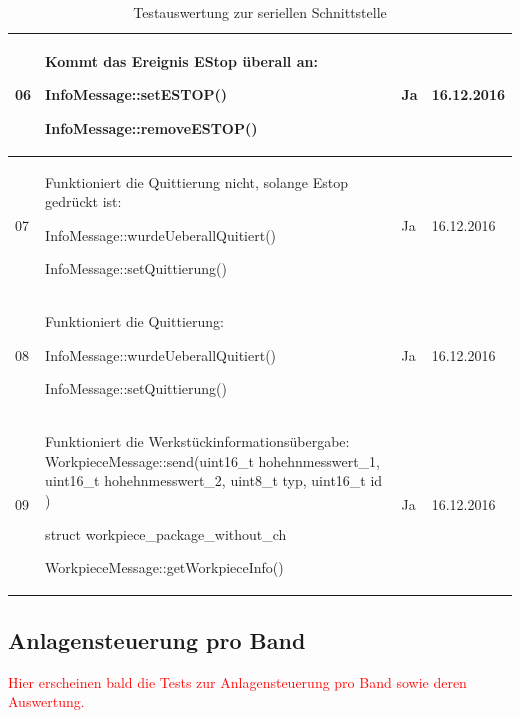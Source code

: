 \documentclass[a4paper, 11pt]{article}
\begin{document}
\begin{table}[H]
\begin{tabularx}{\textwidth}{|l|X|l|l|}
        06&Kommt das Ereignis EStop überall an:
        \begin{compactenum}[]
            \item \ttfamily InfoMessage::setESTOP()
            \item \ttfamily InfoMessage::removeESTOP()
        \end{compactenum}
        &Ja&16.12.2016\\
        \hline
        
        07&Funktioniert die Quittierung nicht, solange Estop gedrückt ist:
        \begin{compactenum}[]
            \item \ttfamily InfoMessage::wurdeUeberallQuitiert()
            \item \ttfamily InfoMessage::setQuittierung()
        \end{compactenum}
        &Ja&16.12.2016\\
        \hline
        
        08&Funktioniert die Quittierung:
        \begin{compactenum}[]
            \item \ttfamily InfoMessage::wurdeUeberallQuitiert()
            \item \ttfamily InfoMessage::setQuittierung()
        \end{compactenum}
        &Ja&16.12.2016\\
        \hline
        
        09&Funktioniert die Werkstückinformationsübergabe:
        {\ttfamily WorkpieceMessage::send(uint16\_t hohehnmesswert\_1, uint16\_t hohehnmesswert\_2, uint8\_t typ, uint16\_t id )}
        \begin{compactenum}[]
            \item \ttfamily struct workpiece\_package\_without\_ch 
            \item \ttfamily WorkpieceMessage::getWorkpieceInfo()
        \end{compactenum}
        &Ja&16.12.2016\\
        \hline
    \end{tabularx}
    \caption{Testauswertung zur seriellen Schnittstelle}
    \label{tstserintf}
\end{table}

\newpage

\subsection{Anlagensteuerung pro Band}
\textcolor{red}{Hier erscheinen bald die Tests zur Anlagensteuerung pro Band sowie deren Auswertung.}
\end{document}
